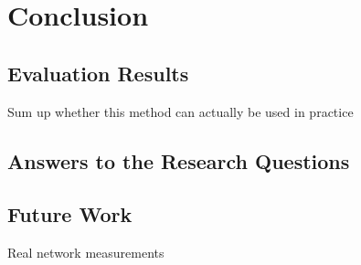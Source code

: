 \chapter{Conclusion}

\section{Evaluation Results}
Sum up whether this method can actually be used in practice
\section{Answers to the Research Questions}

\section{Future Work}
Real network measurements